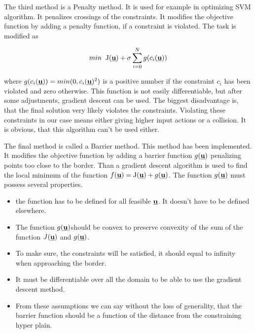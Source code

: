 \documentclass[a4paper,11pt,titlepage]{article}
\newcommand{\uvec}{\textbf{\underline{u}}}
\newcommand{\macf}{f(\uvec)}
\begin{document}
The third method is a Penalty method. It is used for example in optimizing SVM algorithm. It penalizes crossings of the constraints. It modifies the objective function by adding a penalty function, if a constraint is violated. The task is modified as 

\begin{equation}
min\;\;\mathrm{J}(\uvec) + \sigma\sum_{i = 0}^N g(c_i(\uvec))
\end{equation}

where $g(c_i(\uvec)) = min(0, c_i(\uvec)^2)$ is a positive number if the constraint $c_i$ has been violated and zero otherwise. This function is not easily differentiable, but after some adjustments, gradient descent can be used. The biggest disadvantage is, that the final solution very likely violates the constraints. Violating these constraints in our case means either giving higher input actions or a collision. It is obvious, that this algorithm can't be used either.  

The final method is called a Barrier method. This method has been implemented. It modifies the objective function by adding a barrier function $g(\uvec)$ penalizing points too close to the border. Than a gradient descent algorithm is used to find the local minimum of the function $\macf = \mathrm{J}(\uvec) + g(\uvec)$. The function $g(\uvec)$ must possess several properties. 

\begin{itemize}
\item the function has to be defined for all feasible $\uvec$. It doesn't have to be defined elsewhere.
\item The function $g(\uvec)$should be convex to preserve convexity of the sum of the function $J(\uvec)$ and $g(\uvec)$.
\item  To make sure, the constraints will be satisfied, it should equal to infinity when approaching the border.
\item It must be differentiable over all the domain to be able to use the gradient descent method.
\item From these assumptions we can say without the loss of generality, that the barrier function should be a function of the distance from the constraining hyper plain.
\end{itemize}
\end{document}

